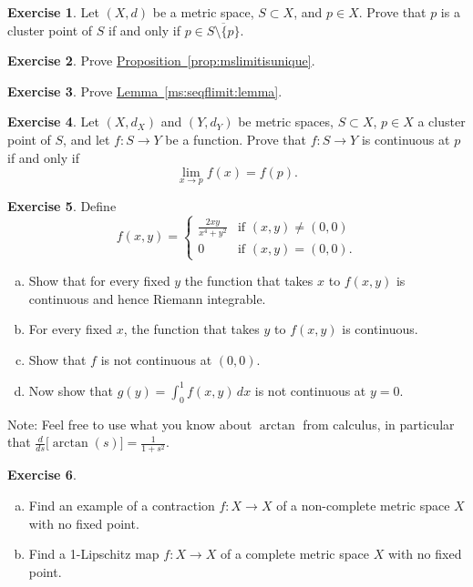 \documentclass[12pt,openany]{book}
\theoremstyle{plain}
\theoremstyle{remark}
\theoremstyle{definition}
\newenvironment{exbox}{%
    \def\FrameCommand{\vrule width 1pt \relax\hspace{10pt}}%
    \MakeFramed{\advance\hsize-\width\FrameRestore}%
}{%
    \endMakeFramed
}
\newenvironment{exparts}{%
    \leavevmode\begin{enumerate}[a),noitemsep,topsep=0pt,parsep=0pt,partopsep=0pt]
}{%
    \end{enumerate}
}
\theoremstyle{exercise}
\newtheorem{exercise}{Exercise}[section]
\theoremstyle{example}
\newcommand{\propref}[1]{\hyperref[#1]{Proposition~\ref*{#1}}}
\newcommand{\lemmaref}[1]{\hyperref[#1]{Lemma~\ref*{#1}}}
\begin{document}
\begin{exbox}
\begin{exercise}
Let $(X,d)$ be a metric space, $S \subset X$, and $p \in X$.  Prove that
$p$ is a cluster point of $S$ if and only if $p \in \overline{S \setminus \{
p \}}$.
\end{exercise}

\begin{exercise}
Prove \propref{prop:mslimitisunique}.
\end{exercise}

\begin{exercise}
Prove \lemmaref{ms:seqflimit:lemma}.
\end{exercise}

\begin{exercise}
Let $(X,d_X)$ and $(Y,d_Y)$ be metric spaces, $S \subset X$, $p \in X$
a cluster point of $S$, and let $f \colon S \to Y$ be a function.
Prove that
$f \colon S \to Y$ is continuous at $p$ if and only if
\begin{equation*}
\lim_{x \to p} f(x) = f(p) .
\end{equation*}
\end{exercise}

\begin{exercise}
Define
\begin{equation*}
f(x,y) =
\begin{cases}
\frac{2xy}{x^4+y^2} & \text{if } (x,y) \not= (0,0) \\
0 & \text{if } (x,y) = (0,0) .
\end{cases}
\end{equation*}
\begin{exparts}
\item
Show that for every fixed $y$ the function that takes $x$ to $f(x,y)$
is continuous and hence Riemann integrable.
\item
For every fixed $x$, the function that takes $y$ to $f(x,y)$ is continuous.
\item
Show that $f$ is not continuous at $(0,0)$.
\item
Now show that $g(y) = \int_0^1 f(x,y)\,dx$ is not continuous at $y=0$.
\end{exparts}
Note: Feel free to use what you know about $\arctan$ from calculus,
in particular that $\frac{d}{ds} \bigl[ \arctan(s) \bigr] = \frac{1}{1+s^2}$.
\end{exercise}

\begin{exercise} \label{exercise:nofixedpoint}
\begin{exparts}
\item
Find an example of a contraction $f \colon X \to X$
of a non-complete metric space $X$ with no
fixed point.
\item
Find a 1-Lipschitz map $f \colon X \to X$ of a complete metric space $X$ with no fixed point.
\end{exparts}
\end{exercise}
\end{exbox}
\end{document}
